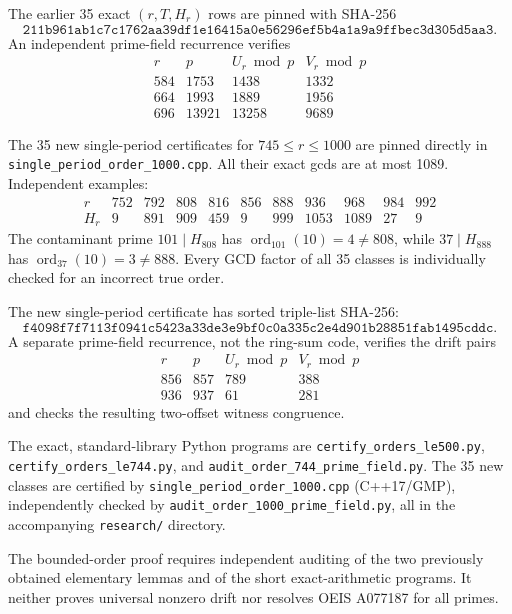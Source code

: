 \documentclass[10pt]{article}
\DeclareMathOperator{\ord}{ord}
\begin{document}
The earlier 35 exact \((r,T,H_r)\) rows are
pinned with SHA-256
\[
\texttt{211b961ab1c7c1762aa39df1e16415a0e56296ef5b4a1a9a9ffbec3d305d5aa3}.
\]
An independent prime-field recurrence verifies
\[
\begin{array}{r|r|r|r}
r&p&U_r\bmod p&V_r\bmod p\\\hline
584&1753&1438&1332\\
664&1993&1889&1956\\
696&13921&13258&9689
\end{array}
\]

The 35 new single-period certificates for \(745\le r\le1000\)
are pinned directly in \texttt{single\_period\_order\_1000.cpp}.
All their exact gcds are at most 1089. Independent examples:
\[
\begin{array}{r|rrrrrrrrrr}
r&752&792&808&816&856&888&936&968&984&992\\\hline
H_r&9&891&909&459&9&999&1053&1089&27&9
\end{array}
\]
The contaminant prime \(101\mid H_{808}\) has
\(\ord_{101}(10)=4\ne808\), while
\(37\mid H_{888}\) has \(\ord_{37}(10)=3\ne888\).
Every GCD factor of all 35 classes is individually
checked for an incorrect true order.

The new single-period certificate has sorted triple-list
SHA-256:
\[
\texttt{f4098f7f7113f0941c5423a33de3e9bf0c0a335c2e4d901b28851fab1495cddc}.
\]
A separate prime-field recurrence, not the ring-sum code,
verifies the drift pairs
\[
\begin{array}{r|r|r|r}
r&p&U_r\bmod p&V_r\bmod p\\\hline
856&857&789&388\\
936&937&61&281
\end{array}
\]
and checks the resulting two-offset witness congruence.

The exact, standard-library Python programs are
\texttt{certify\_orders\_le500.py},
\texttt{certify\_orders\_le744.py},
and \texttt{audit\_order\_744\_prime\_field.py}.
The 35 new classes are certified by
\texttt{single\_period\_order\_1000.cpp}
(C++17/GMP), independently checked by
\texttt{audit\_order\_1000\_prime\_field.py},
all in the accompanying \texttt{research/} directory.

The bounded-order proof requires independent auditing of
the two previously obtained elementary lemmas and of
the short exact-arithmetic programs.
It neither proves universal nonzero drift
nor resolves OEIS A077187 for all primes.
\end{document}
